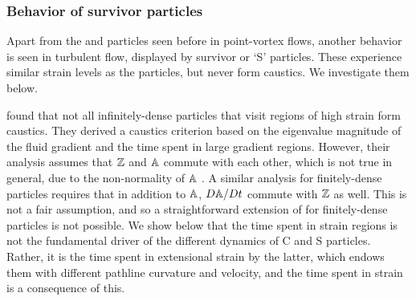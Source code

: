 \documentclass[../Rajarshi-thesis-draft.tex]{subfiles}
\begin{document}
\subsubsection{Behavior of survivor \su particles}\label{int-nc-dets}
Apart from the \cs and \es particles seen before in point-vortex flows, another behavior is seen in turbulent flow, displayed by survivor or `S' particles. These experience similar strain levels as the \cs particles, but never form caustics. We investigate them  below.

\citet{batge2023} found that not all infinitely-dense particles that visit regions of high strain form caustics. They derived a caustics criterion based on the eigenvalue magnitude of the fluid gradient and the time spent in large gradient regions. However, their analysis assumes that $\mathbb{Z}$ and $\mathbb{A}$ commute with each other, which is not true in general, due to the non-normality of $\mathbb{A}$ \cite{kronborg2023}. A similar analysis for finitely-dense particles requires that in addition to $\mathbb{A}$, $D\mathbb{A}/Dt$ commute with $\mathbb{Z}$ as well. This is not a fair assumption, and so a straightforward extension of \cite{batge2023} for finitely-dense particles is not possible. We show below that the time spent in strain regions is not the fundamental driver of the different dynamics of C and S particles. Rather, it is the time spent in extensional strain by the latter, which endows them with different pathline curvature and velocity, and the time spent in strain is a consequence of this.
\end{document}
